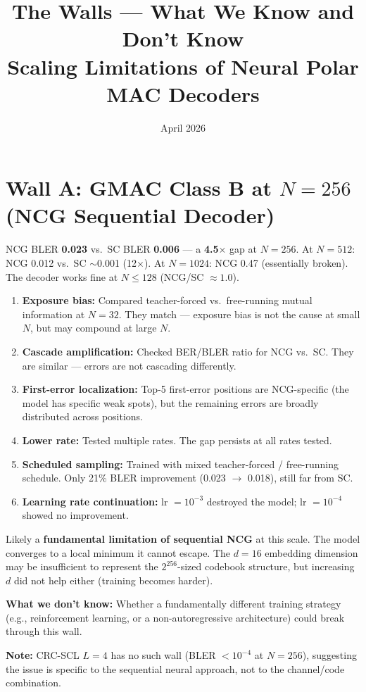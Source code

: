 \documentclass[11pt]{article}
\title{\textbf{The Walls --- What We Know and Don't Know}\\[4pt]
\large Scaling Limitations of Neural Polar MAC Decoders}
\author{}
\date{April 2026}
\begin{document}
\maketitle
\thispagestyle{empty}

\section{Wall A: GMAC Class B at $N = 256$ (NCG Sequential Decoder)}

\begin{diagnosis}[title=Symptom]
NCG BLER \textbf{0.023} vs.\ SC BLER \textbf{0.006} --- a \textbf{4.5$\times$} gap at $N = 256$.
At $N = 512$: NCG 0.012 vs.\ SC ${\sim}$0.001 (12$\times$).
At $N = 1024$: NCG 0.47 (essentially broken).
The decoder works fine at $N \le 128$ (NCG/SC $\approx 1.0$).
\end{diagnosis}

\begin{tested}
\begin{enumerate}[nosep,leftmargin=*]
  \item \textbf{Exposure bias:} Compared teacher-forced vs.\ free-running mutual information at $N = 32$. They match --- exposure bias is not the cause at small $N$, but may compound at large $N$.
  \item \textbf{Cascade amplification:} Checked BER/BLER ratio for NCG vs.\ SC. They are similar --- errors are not cascading differently.
  \item \textbf{First-error localization:} Top-5 first-error positions are NCG-specific (the model has specific weak spots), but the remaining errors are broadly distributed across positions.
  \item \textbf{Lower rate:} Tested multiple rates. The gap persists at all rates tested.
  \item \textbf{Scheduled sampling:} Trained with mixed teacher-forced / free-running schedule. Only 21\% BLER improvement (0.023 $\to$ 0.018), still far from SC.
  \item \textbf{Learning rate continuation:} lr $= 10^{-3}$ destroyed the model; lr $= 10^{-4}$ showed no improvement.
\end{enumerate}
\end{tested}

\begin{conclusion}
Likely a \textbf{fundamental limitation of sequential NCG} at this scale.
The model converges to a local minimum it cannot escape.
The $d = 16$ embedding dimension may be insufficient to represent the $2^{256}$-sized codebook structure, but increasing $d$ did not help either (training becomes harder).

\medskip
\textbf{What we don't know:} Whether a fundamentally different training strategy (e.g., reinforcement learning, or a non-autoregressive architecture) could break through this wall.

\medskip
\textbf{Note:} CRC-SCL $L = 4$ has no such wall (BLER $< 10^{-4}$ at $N = 256$), suggesting the issue is specific to the sequential neural approach, not to the channel/code combination.
\end{conclusion}
\end{document}
